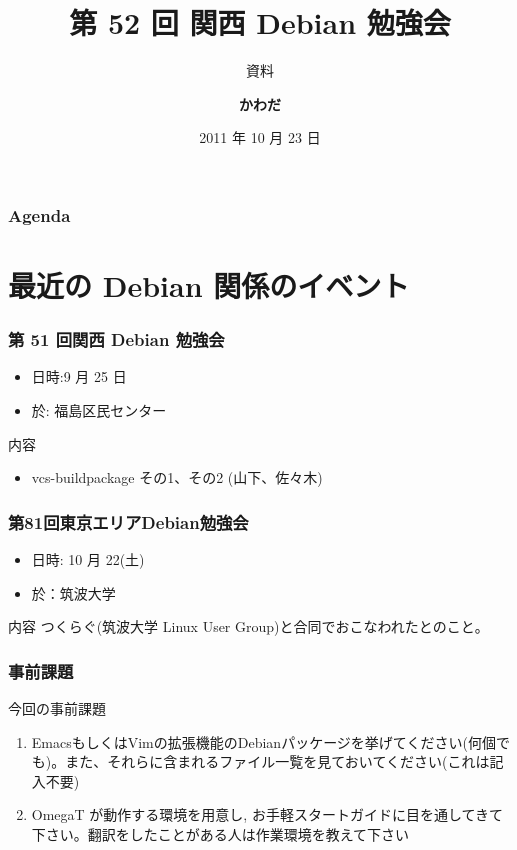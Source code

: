 \documentclass[cjk,dvipdfmx,12pt,%
hyperref={bookmarks=true,bookmarksnumbered=true,bookmarksopen=false,%
colorlinks=false,%
pdftitle={第 52 回 関西 Debian 勉強会},%
pdfauthor={倉敷・のがた・佐々木},%
pdfsubject={資料},%
}]{beamer}
\title{第 52 回 関西 Debian 勉強会}
\subtitle{{\small 資料}}
\author[佐々木 洋平]{{\large\bf かわだ}}
\institute[Debian JP]{{\normalsize\tt 関西 Debian 勉強会}}
\date{{\small 2011 年 10 月 23 日}}
\begin{document}
\settitleslide
\begin{frame}
\titlepage
\end{frame}
\setdefaultslide

\begin{frame}[fragile]
\frametitle{Agenda}
\tableofcontents
\end{frame}

\section{最近の Debian 関係のイベント}


\begin{frame}[fragile]
\frametitle{第 51 回関西 Debian 勉強会}

\begin{itemize}
\item 日時:9 月 25 日
\item 於: 福島区民センター
\end{itemize}

\begin{block}{内容}
  \begin{itemize}
  \item vcs-buildpackage その1、その2 (山下、佐々木)
  \end{itemize}
\end{block}
\end{frame}


\begin{frame}[fragile]
  \frametitle{第81回東京エリアDebian勉強会}
  \begin{itemize}
  \item 日時: 10 月 22(土)
  \item 於：筑波大学
  \end{itemize}
  \begin{block}{内容}
    つくらぐ(筑波大学 Linux User Group)と合同でおこなわれたとのこと。
  \end{block}
\end{frame}



\begin{frame}[fragile]
\frametitle{事前課題}

\begin{block}{今回の事前課題}
\begin{enumerate}
\item EmacsもしくはVimの拡張機能のDebianパッケージを挙げてください(何個でも)。また、それらに含まれるファイル一覧を見ておいてください(これは記入不要)
\item OmegaT が動作する環境を用意し, お手軽スタートガイドに目を通してきて下さい。翻訳をしたことがある人は作業環境を教えて下さい
\end{enumerate}

\end{block}
\end{frame}
\end{document}
